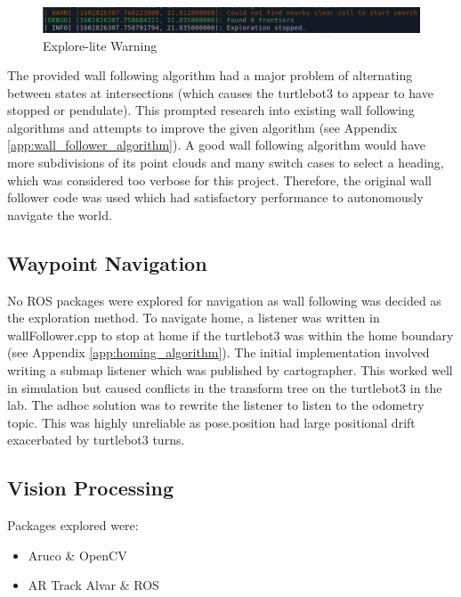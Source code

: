 \documentclass[11pt, a4, nocenter, margin=150mm]{article}
\begin{document}
	\begin{figure}[h!]
		\centering
		\includegraphics[width=120mm]{explore-lite-warning.png}
		\caption{Explore-lite Warning}
		\label{fig:explore_lite_warning}
	\end{figure}
	
	The provided wall following algorithm had a major problem of alternating between states at intersections (which causes the turtlebot3 to appear to have stopped or pendulate). This prompted research into existing wall following algorithms and attempts to improve the given algorithm (see Appendix \ref{app:wall_follower_algorithm}). A good wall following algorithm would have more subdivisions of its point clouds and many switch cases to select a heading, which was considered too verbose for this project. Therefore, the original wall follower code was used which had satisfactory performance to autonomously navigate the world.

	\subsection{Waypoint Navigation}
	\label{sec:navigation}

	No ROS packages were explored for navigation as wall following was decided as the exploration method. To navigate home, a listener was written in wallFollower.cpp to stop at home if the turtlebot3 was within the home boundary (see Appendix \ref{app:homing_algorithm}). The initial implementation involved writing a submap listener which was published by cartographer. This worked well in simulation but caused conflicts in the transform tree on the turtlebot3 in the lab. The adhoc solution was to rewrite the listener to listen to the odometry topic. This was highly unreliable as pose.position had large positional drift exacerbated by turtlebot3 turns.

	\subsection{Vision Processing}
	\label{sec:vision}

	Packages explored were:
	\begin{itemize}[noitemsep, nolistsep]
		\item Aruco \& OpenCV
		\item AR Track Alvar \& ROS
	\end{itemize}
\end{document}
